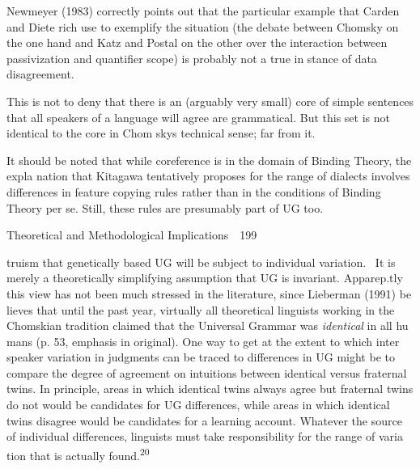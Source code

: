 \setcounter{listWWNumxviileveli}{16}
\begin{listWWNumxviileveli}
\item 
\begin{styleStandard}
Newmeyer (1983) correctly points out that the particular example that Carden and Diete\- rich use to exemplify the situation (the debate between Chomsky on the one hand and Katz and Postal on the other over the interaction between passivization and quantifier scope) is probably not a true in\- stance of data disagreement.
\end{styleStandard}


\item 
\begin{styleStandard}
This is not to deny that there is an (arguably very small) core of simple sentences that all speakers of a language will agree are grammatical. But this set is not identical to the core in Chom\- sky{\textquotesingle}s technical sense; far from it.
\end{styleStandard}


\item 
\begin{styleStandard}
It should be noted that while coreference is in the domain of Binding Theory, the expla\- nation that Kitagawa tentatively proposes for the range of dialects involves differences in feature\- copying rules rather than in the conditions of Binding Theory per se. Still, these rules are presumably part of UG too.
\end{styleStandard}


\end{listWWNumxviileveli}
\clearpage\setcounter{page}{1}\begin{styleStandard}
Theoretical and Methodological Implications\ \ 199
\end{styleStandard}


\begin{styleStandard}
truism that genetically based UG will be subject to individual variation. \ It is merely a theoretically simplifying assumption that UG is invariant. Apparep.tly this view has not been much stressed in the literature, since Lieberman (1991) be\- lieves that {\textquotedbl}until the past year, virtually all theoretical linguists working in the Chomskian tradition claimed that the Universal Grammar was \textit{identical}\textit{ }in all hu\- mans{\textquotedbl} (p. 53, emphasis in original). One way to get at the extent to which inter\- speaker variation in judgments can be traced to differences in UG might be to compare the degree of agreement on intuitions between identical versus fraternal twins. In principle, areas in which identical twins always agree but fraternal twins do not would be candidates for UG differences, while areas in which identical twins disagree would be candidates for a learning account. Whatever the source of individual differences, linguists must take responsibility for the range of varia\- tion that is actually found.\textsuperscript{20}
\end{styleStandard}


